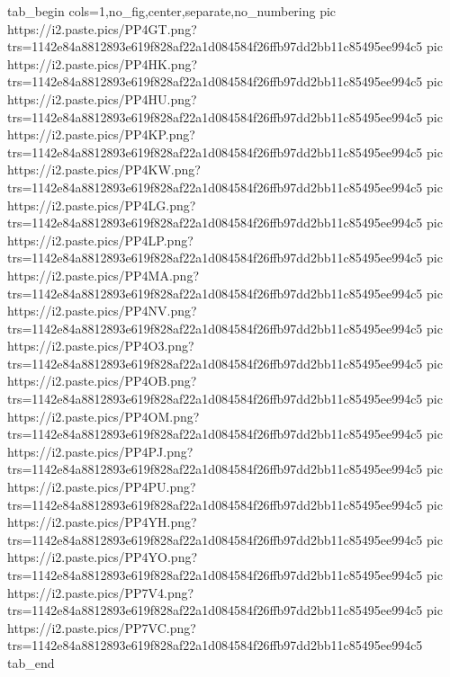\ifcmt
  tab_begin cols=1,no_fig,center,separate,no_numbering
     pic https://i2.paste.pics/PP4GT.png?trs=1142e84a8812893e619f828af22a1d084584f26ffb97dd2bb11c85495ee994c5
     pic https://i2.paste.pics/PP4HK.png?trs=1142e84a8812893e619f828af22a1d084584f26ffb97dd2bb11c85495ee994c5
     pic https://i2.paste.pics/PP4HU.png?trs=1142e84a8812893e619f828af22a1d084584f26ffb97dd2bb11c85495ee994c5
     pic https://i2.paste.pics/PP4KP.png?trs=1142e84a8812893e619f828af22a1d084584f26ffb97dd2bb11c85495ee994c5
     pic https://i2.paste.pics/PP4KW.png?trs=1142e84a8812893e619f828af22a1d084584f26ffb97dd2bb11c85495ee994c5
     pic https://i2.paste.pics/PP4LG.png?trs=1142e84a8812893e619f828af22a1d084584f26ffb97dd2bb11c85495ee994c5
     pic https://i2.paste.pics/PP4LP.png?trs=1142e84a8812893e619f828af22a1d084584f26ffb97dd2bb11c85495ee994c5
     pic https://i2.paste.pics/PP4MA.png?trs=1142e84a8812893e619f828af22a1d084584f26ffb97dd2bb11c85495ee994c5
     pic https://i2.paste.pics/PP4NV.png?trs=1142e84a8812893e619f828af22a1d084584f26ffb97dd2bb11c85495ee994c5
     pic https://i2.paste.pics/PP4O3.png?trs=1142e84a8812893e619f828af22a1d084584f26ffb97dd2bb11c85495ee994c5
     pic https://i2.paste.pics/PP4OB.png?trs=1142e84a8812893e619f828af22a1d084584f26ffb97dd2bb11c85495ee994c5
     pic https://i2.paste.pics/PP4OM.png?trs=1142e84a8812893e619f828af22a1d084584f26ffb97dd2bb11c85495ee994c5
     pic https://i2.paste.pics/PP4PJ.png?trs=1142e84a8812893e619f828af22a1d084584f26ffb97dd2bb11c85495ee994c5
     pic https://i2.paste.pics/PP4PU.png?trs=1142e84a8812893e619f828af22a1d084584f26ffb97dd2bb11c85495ee994c5
     pic https://i2.paste.pics/PP4YH.png?trs=1142e84a8812893e619f828af22a1d084584f26ffb97dd2bb11c85495ee994c5
     pic https://i2.paste.pics/PP4YO.png?trs=1142e84a8812893e619f828af22a1d084584f26ffb97dd2bb11c85495ee994c5
     pic https://i2.paste.pics/PP7V4.png?trs=1142e84a8812893e619f828af22a1d084584f26ffb97dd2bb11c85495ee994c5
     pic https://i2.paste.pics/PP7VC.png?trs=1142e84a8812893e619f828af22a1d084584f26ffb97dd2bb11c85495ee994c5
  tab_end
\fi
